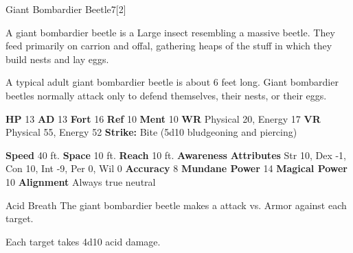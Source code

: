   
  \begin{monsection}{Giant Bombardier Beetle}{7}[2]
    \vspace{-1em}\vspace{-1em}
    \vspace{0em}

    
        A giant bombardier beetle is a Large insect resembling a massive beetle.
        They feed primarily on carrion and offal, gathering heaps of the stuff in which they build nests and lay eggs.
      
        A typical adult giant bombardier beetle is about 6 feet long.
        Giant bombardier beetles normally attack only to defend themselves, their nests, or their eggs.
      

    \begin{spellcontent}
      \begin{spelltargetinginfo}
        \pari \textbf{HP} 13 \monsep
          \textbf{AD} 13 \monsep
          \textbf{Fort} 16 \monsep
          \textbf{Ref} 10 \monsep
          \textbf{Ment} 10
        \pari \textbf{WR} Physical 20, Energy 17 \monsep
        \textbf{VR} Physical 55, Energy 52
        \pari \textbf{Strike:}
            Bite  (5d10 bludgeoning and piercing)
      \end{spelltargetinginfo}
    \end{spellcontent}
    \begin{monsterfooter}
      \pari \textbf{Speed} 40 ft. \monsep
        \textbf{Space} 10 ft. \monsep
        \textbf{Reach} 10 ft.
      \pari \textbf{Awareness} 
      \pari \textbf{Attributes}
        Str 10, Dex -1,
        Con 10, Int -9,
        Per 0, Wil 0
      \pari \textbf{Accuracy} 8 \monsep
        \textbf{Mundane Power} 14 \monsep
      \textbf{Magical Power} 10
      \pari \textbf{Alignment} Always true neutral
    \end{monsterfooter}
  \end{monsection}
  \begin{freeability}{Acid Breath}
       The giant bombardier beetle makes a  attack
        vs. Armor against each target.
    
    \hit Each target takes 4d10 acid damage.
    \end{freeability}
  
